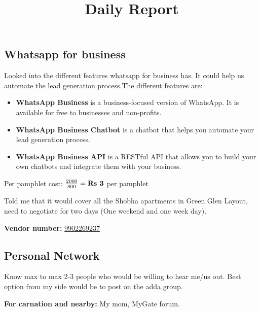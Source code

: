 \documentclass[12pt, a4paper]{article}
\begin{document}
\title{Daily Report}
\maketitle

\subsection{Whatsapp for business}

Looked into the different features whatsapp for business has. It could help us automate the lead generation process.The different features are:

\begin{itemize}
    \item \textbf{WhatsApp Business} is a business-focused version of WhatsApp. It is available for free to businesses and non-profits.
    \item \textbf{WhatsApp Business Chatbot} is a chatbot that helps you automate your lead generation process.
    \item \textbf{WhatsApp Business API} is a RESTful API that allows you to build your own chatbots and integrate them with your business.
\end{itemize}


\vspace{0.5cm}

Per pamphlet cost: $\frac{2000}{800} = \textbf{Rs \the\numexpr 2000 / 800 \relax} $ per pamphlet

\bigskip

\noindent Told me that it would cover all the Shobha apartments in Green Glen Layout, need to negotiate for two days (One weekend and one week day).

\bigskip

\textbf{Vendor number:} \href{tel:+919902269237}{9902269237}

\subsection{Personal Network}

Know max to max 2-3 people who would be willing to hear me/us out. Best option from my side would be to post on the adda group.

\vspace{0.25cm}

\noindent \textbf{For carnation and nearby:} My mom, MyGate forum.

\vspace{0.25cm}
\end{document}
